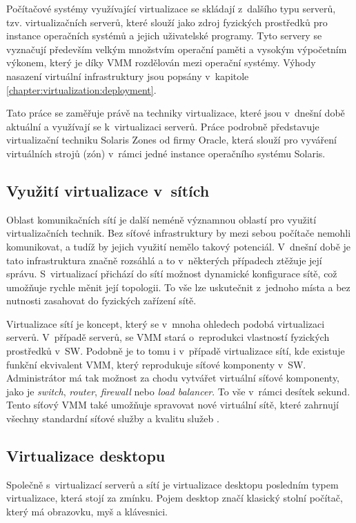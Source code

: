 Počítačové systémy využívající virtualizace se skládají z~dalšího typu serverů, tzv. virtualizačních serverů, které slouží
jako zdroj fyzických prostředků pro instance operačních systémů a jejich uživatelské programy. Tyto servery se vyznačují 
především velkým množstvím operační paměti a vysokým výpočetním výkonem, který je díky VMM rozdělován mezi operační systémy.
Výhody nasazení virtuální infrastruktury jsou popsány v~kapitole \ref{chapter:virtualization:deployment}.

Tato práce se zaměřuje právě na techniky virtualizace, které jsou v~dnešní době aktuální a využívají se k~virtualizaci serverů.
Práce podrobně představuje virtualizační techniku Solaris Zones od firmy Oracle, která slouží pro vyváření virtuálních strojů
(zón) v~rámci jedné instance operačního systému Solaris.
\subsection{Využití virtualizace v~sítích}
\label{chapter:virtualization:it:networks}
Oblast komunikačních sítí je další neméně významnou oblastí pro využití virtualizačních technik. Bez síťové infrastruktury by
mezi sebou počítače nemohli komunikovat, a tudíž by jejich využití nemělo takový potenciál. V~dnešní době je tato infrastruktura
značně rozsáhlá a to v~některých případech ztěžuje její správu. S~virtualizací přichází do sítí možnost dynamické konfigurace
sítě, což umožňuje rychle měnit její topologii. To vše lze uskutečnit z~jednoho místa a bez nutnosti zasahovat do fyzických
zařízení sítě.

Virtualizace sítí je koncept, který se v~mnoha ohledech podobá virtualizaci serverů. V~případě serverů, se VMM stará o~reprodukci
vlastností fyzických prostředků v~SW. Podobně je to tomu i v~případě virtualizace sítí, kde existuje funkční ekvivalent VMM, který
reprodukuje síťové komponenty v~SW. Administrátor má tak možnost za chodu vytvářet virtuální síťové komponenty, jako je 
\textit{switch}, \textit{router}, \textit{firewall} nebo \textit{load balancer}. To vše v~rámci desítek sekund. Tento síťový
VMM také umožňuje spravovat nové virtuální sítě, které zahrnují všechny standardní síťové služby a kvalitu služeb 
\cite{article:vmware:network_virtualization}.
\subsection{Virtualizace desktopu}
\label{chapter:virtualization:it:desktop}
Společně s~virtualizací serverů a sítí je virtualizace desktopu posledním typem virtualizace, která stojí za zmínku. Pojem
desktop značí klasický stolní počítač, který má obrazovku, myš a klávesnici.


